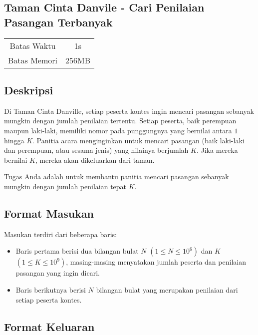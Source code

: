 \documentclass{article}
\begin{document}
\begin{center}
    \section*{Taman Cinta Danvile - Cari Penilaian Pasangan Terbanyak}
    
    \begin{tabular}{ | c c | }
        \hline
        Batas Waktu  & 1s \\ 
        Batas Memori & 256MB \\ 
        \hline
    \end{tabular}
\end{center}

\subsection*{Deskripsi}

Di Taman Cinta Danville, setiap peserta kontes ingin mencari pasangan sebanyak mungkin dengan jumlah penilaian tertentu. Setiap peserta, baik perempuan maupun laki-laki, memiliki nomor pada punggungnya yang bernilai antara $1$ hingga $K$. Panitia acara menginginkan untuk mencari pasangan (baik laki-laki dan perempuan, atau sesama jenis) yang nilainya berjumlah $K$. Jika mereka bernilai $K$, mereka akan dikeluarkan dari taman. 

Tugas Anda adalah untuk membantu panitia mencari pasangan sebanyak mungkin dengan jumlah penilaian tepat $K$.

\subsection*{Format Masukan}

Masukan terdiri dari beberapa baris:
\begin{itemize}
    \item Baris pertama berisi dua bilangan bulat $N$ $(1 \leq N \leq 10^6)$ dan $K$ $(1 \leq K \leq 10^9)$, masing-masing menyatakan jumlah peserta dan penilaian pasangan yang ingin dicari.
    \item Baris berikutnya berisi $N$ bilangan bulat yang merupakan penilaian dari setiap peserta kontes.
\end{itemize}

\subsection*{Format Keluaran}
\end{document}
